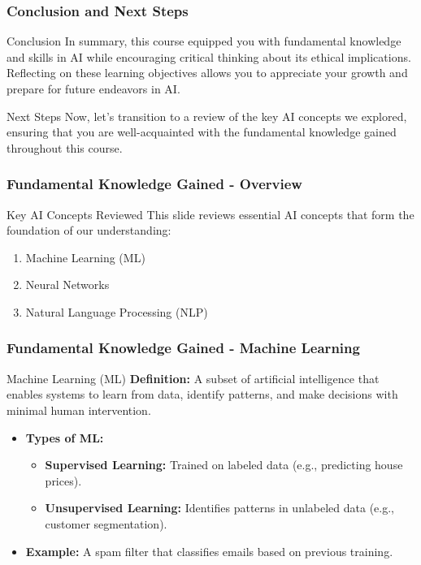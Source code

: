 \documentclass[aspectratio=169]{beamer}
\begin{document}
\begin{frame}[fragile]
    \frametitle{Conclusion and Next Steps}
    \begin{block}{Conclusion}
        In summary, this course equipped you with fundamental knowledge and skills in AI while encouraging critical thinking about its ethical implications. 
        Reflecting on these learning objectives allows you to appreciate your growth and prepare for future endeavors in AI.
    \end{block}
    \begin{block}{Next Steps}
        Now, let's transition to a review of the key AI concepts we explored, ensuring that you are well-acquainted with the fundamental knowledge gained throughout this course.
    \end{block}
\end{frame}

\begin{frame}[fragile]
    \frametitle{Fundamental Knowledge Gained - Overview}
    \begin{block}{Key AI Concepts Reviewed}
        This slide reviews essential AI concepts that form the foundation of our understanding:
        \begin{enumerate}
            \item Machine Learning (ML)
            \item Neural Networks
            \item Natural Language Processing (NLP)
        \end{enumerate}
    \end{block}
\end{frame}

\begin{frame}[fragile]
    \frametitle{Fundamental Knowledge Gained - Machine Learning}
    \begin{block}{Machine Learning (ML)}
        \textbf{Definition:} A subset of artificial intelligence that enables systems to learn from data, identify patterns, and make decisions with minimal human intervention.
        \begin{itemize}
            \item \textbf{Types of ML:}
            \begin{itemize}
                \item \textbf{Supervised Learning:} Trained on labeled data (e.g., predicting house prices).
                \item \textbf{Unsupervised Learning:} Identifies patterns in unlabeled data (e.g., customer segmentation).
            \end{itemize}
            \item \textbf{Example:} A spam filter that classifies emails based on previous training.
        \end{itemize}
    \end{block}
\end{frame}
\end{document}
